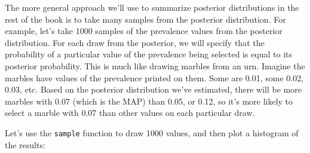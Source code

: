 \documentclass[
]{book}
\newenvironment{Shaded}{\begin{snugshade}}{\end{snugshade}}
\newcommand{\AttributeTok}[1]{\textcolor[rgb]{0.13,0.29,0.53}{#1}}
\newcommand{\CommentTok}[1]{\textcolor[rgb]{0.56,0.35,0.01}{\textit{#1}}}
\newcommand{\ConstantTok}[1]{\textcolor[rgb]{0.56,0.35,0.01}{#1}}
\newcommand{\DecValTok}[1]{\textcolor[rgb]{0.00,0.00,0.81}{#1}}
\newcommand{\FloatTok}[1]{\textcolor[rgb]{0.00,0.00,0.81}{#1}}
\newcommand{\FunctionTok}[1]{\textcolor[rgb]{0.13,0.29,0.53}{\textbf{#1}}}
\newcommand{\NormalTok}[1]{#1}
\newcommand{\OtherTok}[1]{\textcolor[rgb]{0.56,0.35,0.01}{#1}}
\newcommand{\SpecialCharTok}[1]{\textcolor[rgb]{0.81,0.36,0.00}{\textbf{#1}}}
\newcommand{\StringTok}[1]{\textcolor[rgb]{0.31,0.60,0.02}{#1}}
\begin{document}
The more general approach we'll use to summarize posterior distributions
in the rest of the book is to take many samples from the posterior
distribution. For example, let's take 1000 samples of the prevalence
values from the posterior distribution. For each draw from the
posterior, we will specify that the probability of a particular value of
the prevalence being selected is equal to its posterior probability.
This is much like drawing marbles from an urn. Imagine the marbles have
values of the prevalence printed on them. Some are 0.01, some 0.02,
0.03, etc. Based on the posterior distribution we've estimated, there
will be more marbles with 0.07 (which is the MAP) than 0.05, or 0.12, so
it's more likely to select a marble with 0.07 than other values on each
particular draw.

Let's use the \texttt{sample} function to draw 1000 values, and then plot a
histogram of the results:

\begin{Shaded}
\end{Shaded}
\end{document}
